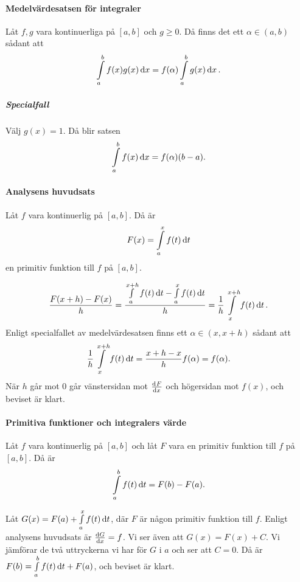 \proof

\paragraph{Medelvärdesatsen för integraler}
Låt $f, g$ vara kontinuerliga på $[a, b]$ och $g\geq 0$. Då finns det ett $\alpha\in (a, b)$ sådant att
\begin{align*}
	\int\limits_{a}^{b}f(x)g(x)\dd{x} = f(\alpha)\int\limits_{a}^{b}g(x)\dd{x}.
\end{align*}

\subparagraph{Specialfall}
Välj $g(x) = 1$. Då blir satsen
\begin{align*}
	\int\limits_{a}^{b}f(x)\dd{x} = f(\alpha)(b - a).
\end{align*}

\proof

\paragraph{Analysens huvudsats}
Låt $f$ vara kontinuerlig på $[a, b]$. Då är
\begin{align*}
	F(x) = \int\limits_{a}^{x}f(t)\dd{t}
\end{align*}
en primitiv funktion till $f$ på $[a, b]$.

\proof
\begin{align*}
	\frac{F(x + h) - F(x)}{h} = \frac{\int\limits_{a}^{x + h}f(t)\dd{t} - \int\limits_{a}^{x}f(t)\dd{t}}{h} = \frac{1}{h}\int\limits_{x}^{x + h}f(t)\dd{t}.
\end{align*}
Enligt specialfallet av medelvärdesatsen finns ett $\alpha\in (x, x +h)$ sådant att
\begin{align*}
	\frac{1}{h}\int\limits_{x}^{x + h}f(t)\dd{t} = \frac{x + h - x}{h}f(\alpha) = f(\alpha).
\end{align*}
När $h$ går mot $0$ går vänstersidan mot $\dv[]{F}{x} (x)$ och högersidan mot $f(x)$, och beviset är klart.

\paragraph{Primitiva funktioner och integralers värde}
Låt $f$ vara kontinuerlig på $[a, b]$ och låt $F$ vara en primitiv funktion till $f$ på $[a, b]$. Då är
\begin{align*}
	\int\limits_{a}^{b}f(t)\dd{t} = F(b) - F(a).
\end{align*}

\proof
Låt $G(x) = F(a) + \int\limits_{a}^{x}f(t)\dd{t}$, där $F$ är någon primitiv funktion till $f$. Enligt analysens huvudsats är $\dv{G}{x} = f$. Vi ser även att $G(x) = F(x) + C$. Vi jämförar de två uttryckerna vi har för $G$ i $a$ och ser att $C = 0$. Då är $F(b) = \int\limits_{a}^{b}f(t)\dd{t} + F(a)$, och beviset är klart.

